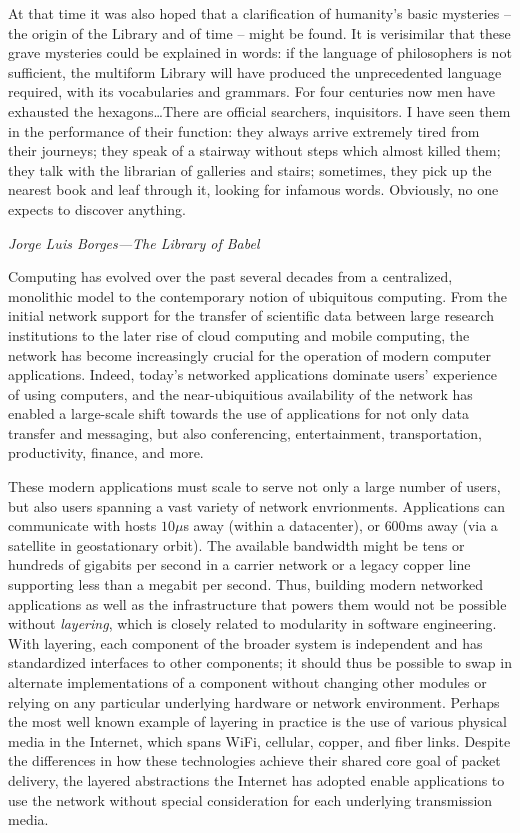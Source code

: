 \setlength{\epigraphwidth}{0.8\textwidth}
\begin{singlespace}
\epigraph{
    \footnotesize
At that time it was also hoped that a clarification of humanity's basic mysteries -- the origin of
the Library and of time -- might be found. It is verisimilar that these grave mysteries could be
explained in words: if the language of philosophers is not sufficient, the multiform Library will have
produced the unprecedented language required, with its vocabularies and grammars. For four
centuries now men have exhausted the hexagons\ldots There are official searchers, inquisitors. I
have seen them in the performance of their function: they always arrive extremely tired from their
journeys; they speak of a stairway without steps which almost killed them; they talk with the librarian of
galleries and stairs; sometimes, they pick up the nearest book and leaf through it, looking for
infamous words. Obviously, no one expects to discover anything.
}{\textit{Jorge Luis Borges---The Library of Babel}}
\end{singlespace}

\noindent
Computing has evolved over the past several decades from a centralized, monolithic model to the contemporary notion of ubiquitous computing. From the initial network support for the transfer of scientific data between large research institutions to the later rise of cloud computing and mobile computing, the network has become increasingly crucial for the operation of modern computer applications. 
Indeed, today's networked applications dominate users' experience of using computers, and the near-ubiquitious availability of the network has enabled a large-scale shift towards the use of applications for not only data transfer and messaging, but also conferencing, entertainment, transportation, productivity, finance, and more.

These modern applications must scale to serve not only a large number of users, but also users spanning a vast variety of network envrionments. Applications can communicate with hosts $10\mu$s away (\ie within a datacenter), or $600$ms away (\ie via a satellite in geostationary orbit). The available bandwidth might be tens or hundreds of gigabits per second in a carrier network or a legacy copper line supporting less than a megabit per second. 
Thus, building modern networked applications as well as the infrastructure that powers them would not be possible without \emph{layering}, which is closely related to modularity in software engineering.
With layering, each component of the broader system is independent and has standardized interfaces to other components; it should thus be possible to swap in alternate implementations of a component without changing other modules or relying on any particular underlying hardware or network environment.
Perhaps the most well known example of layering in practice is the use of various physical media in the Internet, which spans WiFi, cellular, copper, and fiber links.
Despite the differences in how these technologies achieve their shared core goal of packet delivery, the layered abstractions the Internet has adopted enable applications to use the network without special consideration for each underlying transmission media.

